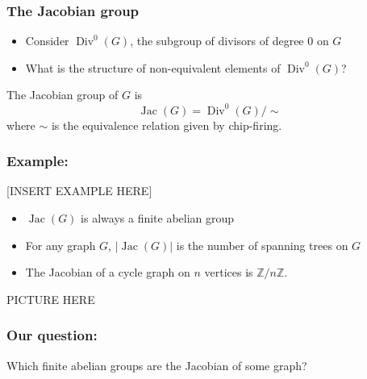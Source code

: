 \documentclass{beamer}
\newcommand{\Z}{\ensuremath{\mathbb{Z}}}
\DeclareMathOperator{\Jac}{Jac}
\DeclareMathOperator{\Div}{Div}
\begin{document}
\begin{frame}
  \frametitle{The Jacobian group}
  \begin{itemize}
  \item Consider $\Div^0(G)$, the subgroup of divisors of degree $0$
    on $G$
    \pause
  \item What is the structure of non-equivalent elements of $\Div^0(G)$?
  \end{itemize}
  \pause
  \begin{definition}
    The Jacobian group of $G$ is
    \begin{equation*}
      \Jac(G) = \Div^0(G)/\sim
    \end{equation*}
    where $\sim$ is the equivalence relation given by chip-firing.
  \end{definition}
\end{frame}

\begin{frame}
  \frametitle{Example:}
  [INSERT EXAMPLE HERE]
\end{frame}

\begin{frame}
  \begin{itemize}
    \item $\Jac(G)$ is always a finite abelian group
      \pause
    \item For any graph $G$, $|\Jac(G)|$ is the number of spanning
      trees on $G$
      \pause
    \item The Jacobian of a cycle graph on $n$ vertices is $\Z/n\Z$. 
  \end{itemize}
  PICTURE HERE
\end{frame}

\begin{frame}
  \frametitle{\textbf{Our question:}} 

  Which finite abelian groups are the Jacobian of some graph?
\end{frame}
\end{document}
